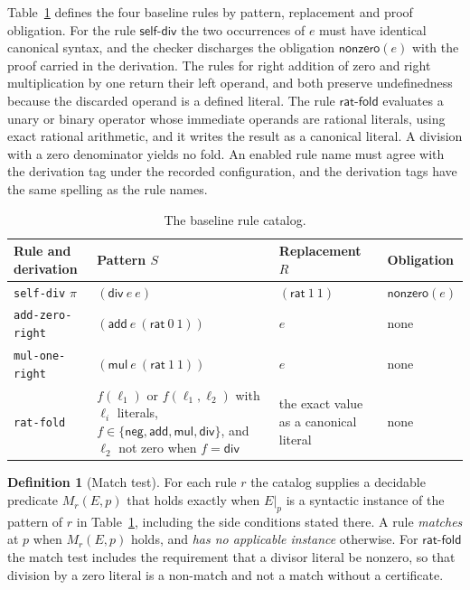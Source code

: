 \documentclass[11pt,a4paper]{article}
\theoremstyle{plain}
\theoremstyle{definition}
\newtheorem{definition}[theorem]{Definition}
\theoremstyle{remark}
\theoremstyle{definition}
\newcommand{\nz}{\mathsf{nonzero}}
\newcommand{\code}[1]{\texttt{#1}}
\begin{document}
Table~\ref{tab:rules} defines the four baseline rules by pattern, replacement and proof obligation. For the rule $\mathsf{self\text{-}div}$ the two occurrences of $e$ must have identical canonical syntax, and the checker discharges the obligation $\nz(e)$ with the proof carried in the derivation. The rules for right addition of zero and right multiplication by one return their left operand, and both preserve undefinedness because the discarded operand is a defined literal. The rule $\mathsf{rat\text{-}fold}$ evaluates a unary or binary operator whose immediate operands are rational literals, using exact rational arithmetic, and it writes the result as a canonical literal. A division with a zero denominator yields no fold. An enabled rule name must agree with the derivation tag under the recorded configuration, and the derivation tags have the same spelling as the rule names.

\begin{table}[t]
\centering\small
\renewcommand{\arraystretch}{1.25}
\begin{tabular}{@{}p{2.7cm}p{3.9cm}p{2.7cm}p{1.8cm}@{}}
\toprule
Rule and derivation & Pattern $S$ & Replacement $R$ & Obligation \\
\midrule
\code{self-div} $\pi$ & $(\mathsf{div}\ e\ e)$ & $(\mathsf{rat}\ 1\ 1)$ & $\nz(e)$ \\
\code{add-zero-right} & $(\mathsf{add}\ e\ (\mathsf{rat}\ 0\ 1))$ & $e$ & none \\
\code{mul-one-right} & $(\mathsf{mul}\ e\ (\mathsf{rat}\ 1\ 1))$ & $e$ & none \\
\code{rat-fold} & $f(\ell_1)$ or $f(\ell_1,\ell_2)$ with $\ell_i$ literals, $f \in \{\mathsf{neg}, \mathsf{add}, \mathsf{mul}, \mathsf{div}\}$, and $\ell_2$ not zero when $f = \mathsf{div}$ & the exact value as a canonical literal & none \\
\bottomrule
\end{tabular}
\caption{The baseline rule catalog.}
\label{tab:rules}
\end{table}

\begin{definition}[Match test]
For each rule $r$ the catalog supplies a decidable predicate $M_r(E,p)$ that holds exactly when $E|_p$ is a syntactic instance of the pattern of $r$ in Table~\ref{tab:rules}, including the side conditions stated there. A rule \emph{matches} at $p$ when $M_r(E,p)$ holds, and \emph{has no applicable instance} otherwise. For $\mathsf{rat\text{-}fold}$ the match test includes the requirement that a divisor literal be nonzero, so that division by a zero literal is a non-match and not a match without a certificate.
\end{definition}
\end{document}
